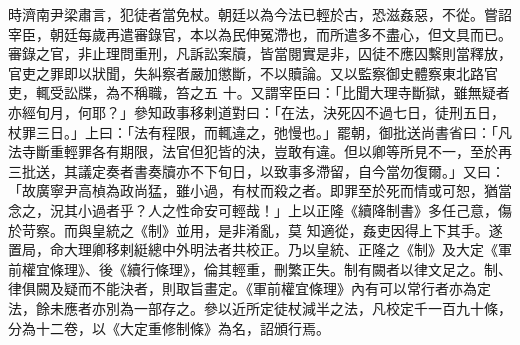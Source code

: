 \begin{pinyinscope}
 時濟南尹梁肅言，犯徒者當免杖。朝廷以為今法已輕於古，恐滋姦惡，不從。嘗詔宰臣，朝廷每歲再遣審錄官，本以為民伸冤滯也，而所遣多不盡心，但文具而已。審錄之官，非止理問重刑，凡訴訟案牘，皆當閱實是非，囚徒不應囚繫則當釋放，官吏之罪即以狀聞，失糾察者嚴加懲斷，不以贖論。又以監察御史體察東北路官吏，輒受訟牒，為不稱職，笞之五
 十。又謂宰臣曰：「比聞大理寺斷獄，雖無疑者亦經旬月，何耶？」參知政事移剌道對曰：「在法，決死囚不過七日，徒刑五日，杖罪三日。」上曰：「法有程限，而輒違之，弛慢也。」罷朝，御批送尚書省曰：「凡法寺斷重輕罪各有期限，法官但犯皆的決，豈敢有違。但以卿等所見不一，至於再三批送，其議定奏者書奏牘亦不下旬日，以致事多滯留，自今當勿復爾。」又曰：「故廣寧尹高楨為政尚猛，雖小過，有杖而殺之者。即罪至於死而情或可恕，猶當念之，況其小過者乎？人之性命安可輕哉！」上以正隆《續降制書》多任己意，傷於苛察。而與皇統之《制》並用，是非淆亂，莫
 知適從，姦吏因得上下其手。遂置局，命大理卿移剌綎總中外明法者共校正。乃以皇統、正隆之《制》及大定《軍前權宜條理》、後《續行條理》，倫其輕重，刪繁正失。制有闕者以律文足之。制、律俱闕及疑而不能決者，則取旨畫定。《軍前權宜條理》內有可以常行者亦為定法，餘未應者亦別為一部存之。參以近所定徒杖減半之法，凡校定千一百九十條，分為十二卷，以《大定重修制條》為名，詔頒行焉。




\end{pinyinscope}
